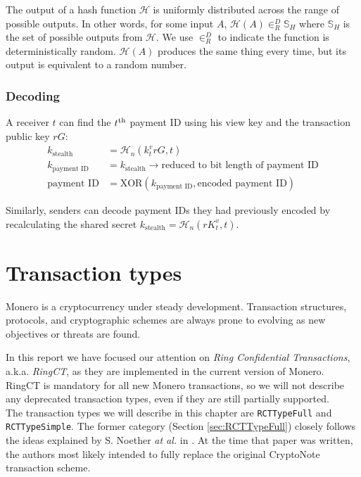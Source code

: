 The output of a hash function $\mathcal{H}$ is uniformly distributed across the range of possible outputs. In other words, for some input $A$, $\mathcal{H}(A) \in^D_R \mathbb{S}_H$ where $\mathbb{S}_H$ is the set of possible outputs from $\mathcal{H}$. We use $\in^D_R$ to indicate the function is deterministically random. $\mathcal{H}(A)$ produces the same thing every time, but its output is equivalent to a random number.

\subsubsection*{Decoding}

A receiver $t$ can find the $t\textsuperscript{th}$ payment ID using his view key and the transaction public key $r G$: \\
\begin{align*}
         k_{\textrm{stealth}} &= \mathcal{H}_n(k_t^v r G, t) \\
      k_{\textrm{payment ID}} &= k_{\textrm{stealth}} \rightarrow \textrm{reduced to bit length of payment ID}\\
          \textrm{payment ID} &= \textrm{XOR}(k_{\textrm{payment ID}}, \textrm{encoded payment ID})
\end{align*}

Similarly, senders can decode payment IDs they had previously encoded by recalculating the shared secret $k_{\textrm{stealth}} = \mathcal{H}_n(r K_t^v, t)$.

\section{Transaction types}
\label{sec:transaction_types}

Monero is a cryptocurrency under steady development. Transaction structures, protocols, and cryptographic schemes are always prone to evolving as new objectives or threats are found.

In this report we have focused our attention on {\em Ring Confidential Transactions}, a.k.a. {\em RingCT}, as they are implemented in the current version of Monero. RingCT is mandatory for all new Monero transactions, so we will not describe any deprecated transaction types, even if they are still partially supported.
\\

The transaction types we will describe in this chapter are {\tt RCTTypeFull} and {\tt RCTTypeSimple}. The former category (Section \ref{sec:RCTTypeFull}) closely follows the ideas explained by S. Noether {\em at al.} in \cite{ledger34}. At the time that paper was written, the authors most likely intended to fully replace the original CryptoNote transaction scheme.

